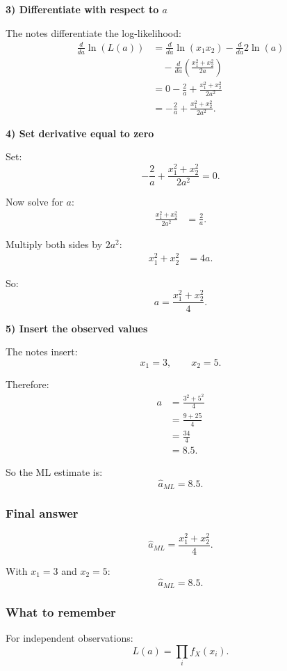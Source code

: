 \documentclass[10pt]{article}
\begin{document}
\textbf{3) Differentiate with respect to \(a\)}

The notes differentiate the log-likelihood:
\begin{align*}
\frac{d}{da}\ln(L(a))
&=
\frac{d}{da}\ln(x_1x_2)
-
\frac{d}{da}2\ln(a)
\\
&\quad
-
\frac{d}{da}
\left(
\frac{x_1^2+x_2^2}{2a}
\right)
\\[2mm]
&=
0
-
\frac{2}{a}
+
\frac{x_1^2+x_2^2}{2a^2}
\\[2mm]
&=
-\frac{2}{a}
+
\frac{x_1^2+x_2^2}{2a^2}.
\end{align*}

\textbf{4) Set derivative equal to zero}

Set:
\[
-\frac{2}{a}
+
\frac{x_1^2+x_2^2}{2a^2}
=0.
\]

Now solve for \(a\):
\begin{align*}
\frac{x_1^2+x_2^2}{2a^2}
&=
\frac{2}{a}.
\end{align*}

Multiply both sides by \(2a^2\):
\begin{align*}
x_1^2+x_2^2
&=
4a.
\end{align*}

So:
\[
a
=
\frac{x_1^2+x_2^2}{4}.
\]

\textbf{5) Insert the observed values}

The notes insert:
\[
x_1=3,
\qquad
x_2=5.
\]

Therefore:
\begin{align*}
a
&=
\frac{3^2+5^2}{4}
\\[2mm]
&=
\frac{9+25}{4}
\\[2mm]
&=
\frac{34}{4}
\\[2mm]
&=
8.5.
\end{align*}

So the ML estimate is:
\[
\hat{a}_{ML}=8.5.
\]

\subsubsection*{Final answer}

\[
\hat{a}_{ML}
=
\frac{x_1^2+x_2^2}{4}.
\]

With \(x_1=3\) and \(x_2=5\):
\[
\hat{a}_{ML}=8.5.
\]

\subsubsection*{What to remember}

For independent observations:
\[
L(a)=
\prod_i f_X(x_i).
\]
\end{document}
